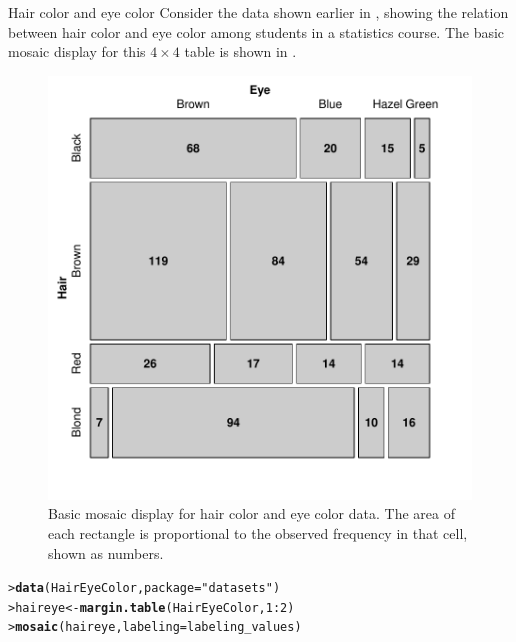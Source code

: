 \documentclass[10pt,krantz2]{krantz}\usepackage[]{graphicx}\usepackage[]{color}
\makeatletter
\newcommand{\hlnum}[1]{\textcolor[rgb]{0.686,0.059,0.569}{#1}}%
\newcommand{\hlstr}[1]{\textcolor[rgb]{0.192,0.494,0.8}{#1}}%
\newcommand{\hlopt}[1]{\textcolor[rgb]{0,0,0}{#1}}%
\newcommand{\hlstd}[1]{\textcolor[rgb]{0.345,0.345,0.345}{#1}}%
\newcommand{\hlkwb}[1]{\textcolor[rgb]{0.69,0.353,0.396}{#1}}%
\newcommand{\hlkwc}[1]{\textcolor[rgb]{0.333,0.667,0.333}{#1}}%
\newcommand{\hlkwd}[1]{\textcolor[rgb]{0.737,0.353,0.396}{\textbf{#1}}}%
\newenvironment{kframe}{%
 \def\at@end@of@kframe{}%
 \ifinner\ifhmode%
  \def\at@end@of@kframe{\end{minipage}}%
  \begin{minipage}{\columnwidth}%
 \fi\fi%
 \def\FrameCommand##1{\hskip\@totalleftmargin \hskip-\fboxsep
 \colorbox{shadecolor}{##1}\hskip-\fboxsep
     \hskip-\linewidth \hskip-\@totalleftmargin \hskip\columnwidth}%
 \MakeFramed {\advance\hsize-\width
   \@totalleftmargin\z@ \linewidth\hsize
   \@setminipage}}%
 {\par\unskip\endMakeFramed%
 \at@end@of@kframe}
\newenvironment{knitrout}{}{} %
\renewenvironment{knitrout}{\small\renewcommand{\baselinestretch}{.85}}{} %
\makeatother
\begin{document}
\begin{Example}[haireye2a]{Hair color and eye color}
Consider the data shown earlier in  ,
showing the relation between hair color and eye color among students
in a statistics course.  The basic mosaic display for this $4 \times 4$
table is shown in .

\begin{knitrout}
\color{fgcolor}\begin{figure}[!htbp]

\centerline{\includegraphics[width=.6\textwidth]{ch05/fig/haireye-mos1-1} }

\caption[Basic mosaic display for hair color and eye color data]{Basic mosaic display for hair color and eye color data.  The area of each rectangle is proportional to the observed frequency in that cell, shown as numbers.}\label{fig:haireye-mos1}
\end{figure}


\end{knitrout}

\begin{knitrout}
\color{fgcolor}\begin{kframe}
\begin{alltt}
\hlstd{> }\hlkwd{data}\hlstd{(HairEyeColor,} \hlkwc{package} \hlstd{=} \hlstr{"datasets"}\hlstd{)}
\hlstd{> }\hlstd{haireye} \hlkwb{<-} \hlkwd{margin.table}\hlstd{(HairEyeColor,} \hlnum{1} \hlopt{:} \hlnum{2}\hlstd{)}
\hlstd{> }\hlkwd{mosaic}\hlstd{(haireye,} \hlkwc{labeling} \hlstd{= labeling_values)}
\end{alltt}
\end{kframe}
\end{knitrout}


\end{Example}
\end{document}
